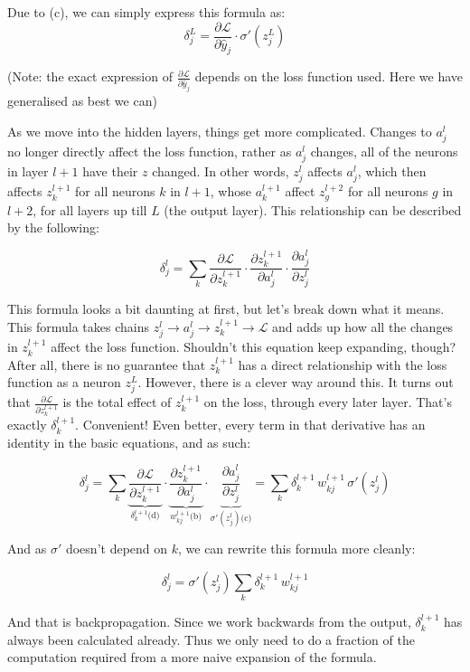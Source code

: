 \documentclass{article}
\begin{document}
Due to (c), we can simply express this formula as:
\[\delta^L_j = \frac{\partial \mathcal{L}}{\partial \hat{y}_j}\cdot\sigma'(z^L_j)\]

(Note: the exact expression of $\frac{\partial \mathcal{L}}{\partial \hat{y}_j}$ depends on the loss function used. Here we have generalised as best we can)

As we move into the hidden layers, things get more complicated. Changes to $a^l_j$ no longer directly affect the loss function, rather as $a^l_j$ changes, all of the neurons in layer $l + 1$ have their $z$ changed. In other words, $z^l_j$ affects $a^l_j$, which then affects $z^{l+1}_k$ for all neurons $k$ in $l + 1$, whose $a^{l+1}_k$ affect $z^{l+2}_g$ for all neurons $g$ in $l + 2$, for all layers up till $L$ (the output layer). This relationship can be described by the following:

\[\delta^l_j = \sum_k \frac{\partial \mathcal{L}}{\partial z^{l+1}_k}\cdot\frac{\partial z^{l+1}_k}{\partial a^l_j}\cdot\frac{\partial a^l_j}{\partial z^l_j}\]

This formula looks a bit daunting at first, but let's break down what it means. This formula takes chains $z^l_j \to a^l_j \to z^{l+1}_k \to \mathcal{L}$ and adds up how all the changes in $z^{l+1}_k$ affect the loss function. Shouldn't this equation keep expanding, though? After all, there is no guarantee that $z^{l+1}_k$ has a direct relationship with the loss function as a neuron $z^L_j$. However, there is a clever way around this. It turns out that $\frac{\partial \mathcal{L}}{\partial z^{l+1}_k}$ is the total effect of $z^{l+1}_k$ on the loss, through every later layer. That’s exactly $\delta^{l+1}_k$. Convenient! Even better, every term in that derivative has an identity in the basic equations, and as such:

\[\delta^l_j = \sum_k \underbrace{\frac{\partial \mathcal{L}}{\partial z^{l+1}_k}}_{\delta^{l+1}_k \text{(d)}}\cdot\underbrace{\frac{\partial z^{l+1}_k}{\partial a^l_j}}_{w^{l+1}_{kj} \text{(b)}}\cdot\underbrace{\frac{\partial a^l_j}{\partial z^l_j}}_{\sigma'(z^l_j) \text{(c)}} = \sum_k \delta^{l+1}_k\, w^{l+1}_{kj}\,\sigma'(z^l_j)\]

And as $\sigma'$ doesn't depend on $k$, we can rewrite this formula more cleanly:

\[\delta^l_j = \sigma'(z^l_j) \sum_k \delta^{l+1}_k\, w^{l+1}_{kj}\]

And that is backpropagation. Since we work backwards from the output, $\delta^{l+1}_k$ has always been calculated already. Thus we only need to do a fraction of the computation required from a more naive expansion of the formula. 
\end{document}
